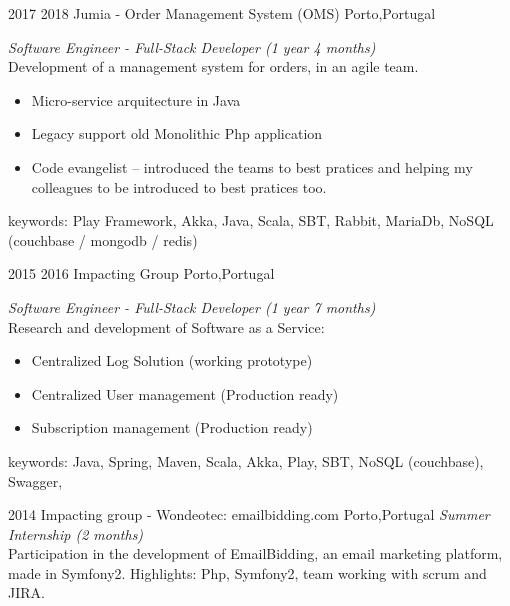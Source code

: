 \documentclass[]{friggeri-cv} %
\begin{document}
\begin{entrylist}
\entry
{2017 2018}
{Jumia - Order Management System (OMS) }
{Porto,Portugal}
{\emph{Software Engineer - Full-Stack Developer (1 year 4 months)} \\
Development of a management system for orders, in an agile team. 
\begin{itemize}
 \item Micro-service arquitecture in Java 
 \item Legacy support old Monolithic Php application 
 \item Code evangelist – introduced the teams to best pratices and helping my colleagues to be introduced to best pratices too.
\end{itemize}
keywords: Play Framework, Akka, Java, Scala, SBT,  Rabbit, MariaDb, NoSQL (couchbase / mongodb / redis) 
}


\entry
{2015 2016}
{Impacting Group }
{Porto,Portugal}
{\emph{Software Engineer - Full-Stack Developer (1 year 7 months)} \\
Research and development of Software as a Service:
\begin{itemize}
 \item Centralized Log Solution (working prototype)
 \item Centralized User management (Production ready)
 \item Subscription management (Production ready)
\end{itemize}
keywords: Java, Spring, Maven, Scala, Akka, Play, SBT, NoSQL (couchbase), Swagger,
}

\entry
{2014}
{Impacting group - {\normalfont Wondeotec: emailbidding.com}}
{Porto,Portugal}
{\emph{Summer Internship (2 months)} \\
Participation in the development of EmailBidding, an email marketing platform, made in Symfony2. 
Highlights: Php, Symfony2, team working with scrum and JIRA. 
}

\end{entrylist}
\end{document}
